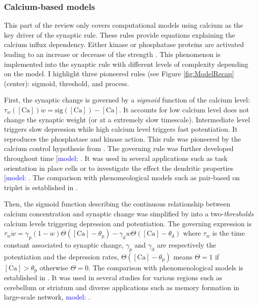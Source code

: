 \subsubsection{Calcium-based models}
This part of the review only covers computational models using calcium as the key driver of the synaptic rule. These rules provide equations explaining the calcium influx dependency. Either kinase or phosphatase proteins are activated leading to an increase or decrease of the strength \citep{meriney_synaptic_2019}. This phenomenon is implemented into the synaptic rule with different levels of complexity depending on the model. I highlight three pioneered rules (see Figure \ref{fig:ModelRecap}(center): sigmoid, threshold, and process. 

First, the synaptic change is governed by a \textit{sigmoid} function of the calcium level: $
\tau_w([\mathrm{Ca}]) \dot{w} = \mbox{sig}([\mathrm{Ca}]) - [\mathrm{Ca}] $. It accounts for low calcium level does not change the synaptic weight (or at a extremely slow timescale). Intermediate level triggers slow depression while high calcium level triggers fast potentiation. It reproduces the phosphatase and kinase action. This rule was pioneered by the calcium control hypothesis from \citep{shouval_unified_2002}. The governing rule was further developed throughout time [\textcolor{blue}{model:} \cite{ karmarkar_model_2002, kumar_frequency-dependent_2011, shouval_stochastic_2005, shah_biophysical_2006,cai_effect_2007, carlson_interplay_2011, rackham_ca2-based_2010}. It was used in several applications such as task orientation in place cells or to investigate the effect the dendritic properties
[\textcolor{blue}{model:} \cite{yu_biophysical_2008, iannella_nonlinear_2014, odonnel_dendritic_2011, franks_complexity_2002}. The comparison with phenomeological models such as pair-based on triplet is established in \citep{shouval_what_2011}.


Then, the sigmoid function describing the continuous relationship between calcium concentration and synaptic change was simplified by \citep{graupner_calcium-based_2012} into a two-\textit{thresholds} calcium levels triggering depression and potentiation. The governing expression is $ \tau_w \dot{w} = \gamma_\mathrm{p}(1-w) \Theta([\mathrm{Ca}]-\theta_\mathrm{p}) - \gamma_\mathrm{d} w \Theta([\mathrm{Ca}]-\theta_\mathrm{d})$ where $\tau_w$ is the time constant associated to synaptic change, $\gamma_p$ and  $\gamma_\mathrm{d}$ are respectively the potentiation and the depression rates, $\Theta([\mathrm{Ca}]-\theta_\mathrm{p})$ means $\Theta = 1$ if $[\mathrm{Ca}]>\theta_\mathrm{p}$ otherwise $\Theta = 0$. The comparison with phenomenological models is established in \citep{graupner_natural_2016}. It was used in several studies for various regions such as cerebellum or striatum and diverse applications such as memory formation in large-scale network, \textcolor{blue}{model:} \citep{bouvier_burst-dependent_2016, chindemi_calcium-based_2020, olcese_sleep_2010, standage_calcium-dependent_2014, higgins_memory_2014, inglebert_synaptic_2021, deperrois_short-term_2020,lappalainen_theoretical_2019,jedrzejewska-szmek_calcium_2017}.

